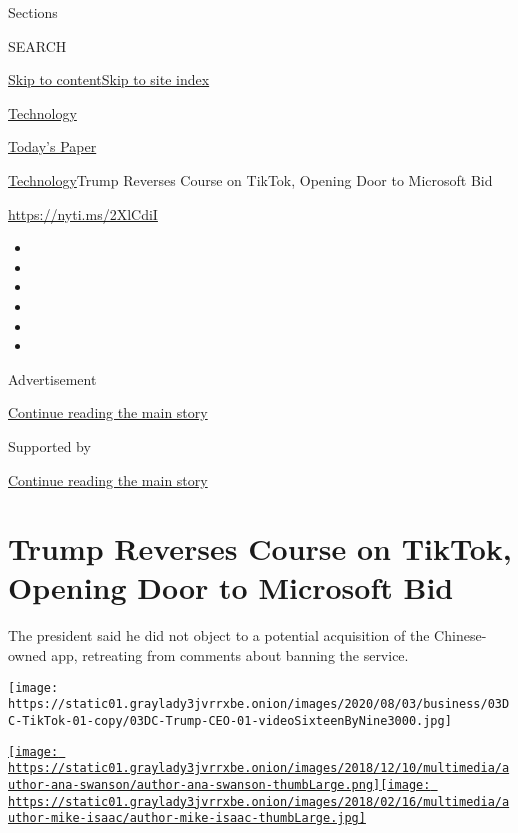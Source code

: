 Sections

SEARCH

\protect\hyperlink{site-content}{Skip to
content}\protect\hyperlink{site-index}{Skip to site index}

\href{https://www.nytimes3xbfgragh.onion/section/technology}{Technology}

\href{https://myaccount.nytimes3xbfgragh.onion/auth/login?response_type=cookie\&client_id=vi}{}

\href{https://www.nytimes3xbfgragh.onion/section/todayspaper}{Today's
Paper}

\href{/section/technology}{Technology}\textbar{}Trump Reverses Course on
TikTok, Opening Door to Microsoft Bid

\href{https://nyti.ms/2XlCdiI}{https://nyti.ms/2XlCdiI}

\begin{itemize}
\item
\item
\item
\item
\item
\item
\end{itemize}

Advertisement

\protect\hyperlink{after-top}{Continue reading the main story}

Supported by

\protect\hyperlink{after-sponsor}{Continue reading the main story}

\hypertarget{trump-reverses-course-on-tiktok-opening-door-to-microsoft-bid}{%
\section{Trump Reverses Course on TikTok, Opening Door to Microsoft
Bid}\label{trump-reverses-course-on-tiktok-opening-door-to-microsoft-bid}}

The president said he did not object to a potential acquisition of the
Chinese-owned app, retreating from comments about banning the service.

\texttt{[image: https://static01.graylady3jvrrxbe.onion/images/2020/08/03/business/03DC-TikTok-01-copy/03DC-Trump-CEO-01-videoSixteenByNine3000.jpg]}

\href{https://www.nytimes3xbfgragh.onion/by/ana-swanson}{\texttt{[image: https://static01.graylady3jvrrxbe.onion/images/2018/12/10/multimedia/author-ana-swanson/author-ana-swanson-thumbLarge.png]}}\href{https://www.nytimes3xbfgragh.onion/by/mike-isaac}{\texttt{[image: https://static01.graylady3jvrrxbe.onion/images/2018/02/16/multimedia/author-mike-isaac/author-mike-isaac-thumbLarge.jpg]}}

